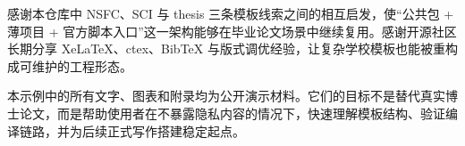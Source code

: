 感谢本仓库中 NSFC、SCI 与 thesis 三条模板线索之间的相互启发，使“公共包 + 薄项目 + 官方脚本入口”这一架构能够在毕业论文场景中继续复用。感谢开源社区长期分享 XeLaTeX、ctex、BibTeX 与版式调优经验，让复杂学校模板也能被重构成可维护的工程形态。

本示例中的所有文字、图表和附录均为公开演示材料。它们的目标不是替代真实博士论文，而是帮助使用者在不暴露隐私内容的情况下，快速理解模板结构、验证编译链路，并为后续正式写作搭建稳定起点。

